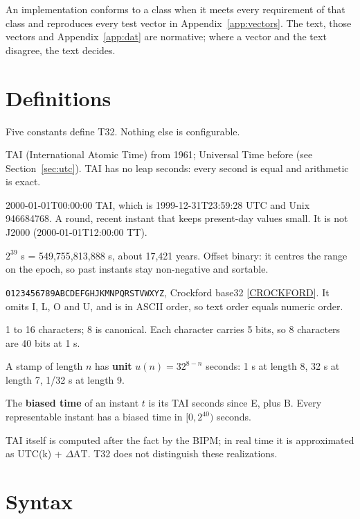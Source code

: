 \documentclass[11pt]{article}
\newcommand{\lit}[1]{\texttt{#1}}
\newcommand{\dAT}{\ensuremath{\Delta\mathrm{AT}}}
\newcommand{\pow}[2]{\ensuremath{#1^{#2}}}
\newcommand{\Sec}[1]{Section~\ref{#1}}
\newcommand{\App}[1]{Appendix~\ref{#1}}
\newcommand{\xref}[1]{[\hyperref[ref:#1]{#1}]}
\begin{document}
An implementation conforms to a class when it meets every requirement of that
class and reproduces every test vector in \App{app:vectors}. The text, those
vectors and \App{app:dat} are normative; where a vector and the text disagree,
the text decides.

\section{Definitions}\label{sec:definitions}

Five constants define T32. Nothing else is configurable.

\begin{description}[style=nextline,leftmargin=1.5em]
\item[Time scale] TAI (International Atomic Time) from 1961; Universal Time
before (see \Sec{sec:utc}). TAI has no leap seconds: every second is equal and
arithmetic is exact.
\item[Epoch E] 2000-01-01T00:00:00 TAI, which is 1999-12-31T23:59:28 UTC and
Unix 946684768. A round, recent instant that keeps present-day values small.
It is not J2000 (2000-01-01T12:00:00 TT).
\item[Bias B] \pow{2}{39} s = 549,755,813,888 s, about 17,421 years. Offset
binary: it centres the range on the epoch, so past instants stay non-negative
and sortable.
\item[Alphabet] \lit{0123456789ABCDEFGHJKMNPQRSTVWXYZ}, Crockford base32
\xref{CROCKFORD}. It omits I, L, O and U, and is in ASCII order, so text order
equals numeric order.
\item[Lengths] 1 to 16 characters; 8 is canonical. Each character carries 5
bits, so 8 characters are 40 bits at 1 s.
\end{description}

A stamp of length $n$ has \textbf{unit} $u(n) = 32^{8-n}$ seconds: 1 s at
length 8, 32 s at length 7, 1/32 s at length 9.

The \textbf{biased time} of an instant $t$ is its TAI seconds since E, plus B.
Every representable instant has a biased time in $[0, 2^{40})$ seconds.

TAI itself is computed after the fact by the BIPM; in real time it is
approximated as UTC(k) + \dAT. T32 does not distinguish these realizations.

\section{Syntax}\label{sec:syntax}
\end{document}
